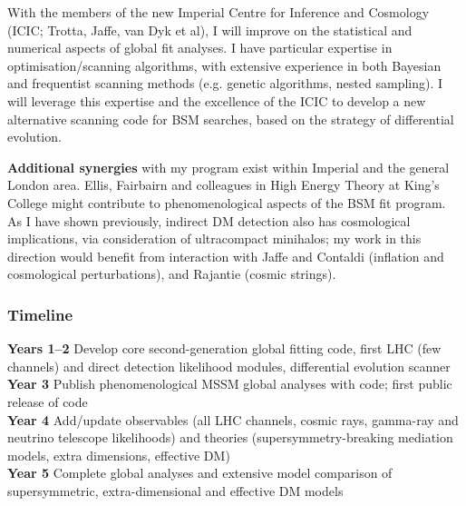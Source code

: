 \documentclass[10pt,oneside,twocolumn,a4paper]{article}
\begin{document}
With the members of the new Imperial Centre for Inference and Cosmology (ICIC; Trotta, Jaffe, van Dyk et al), I will improve on the statistical and numerical aspects of global fit analyses.  I have particular expertise in optimisation/scanning algorithms, with extensive experience in both Bayesian and frequentist scanning methods (e.g. genetic algorithms, nested sampling).  I will leverage this expertise and the excellence of the ICIC to develop a new alternative scanning code for BSM searches, based on the strategy of differential evolution.

\textbf{Additional synergies} with my program exist within Imperial and the general London area.  Ellis, Fairbairn and colleagues in High Energy Theory at King's College might contribute to phenomenological aspects of the BSM fit program.  As I have shown previously, indirect DM detection also has cosmological implications, via consideration of ultracompact minihalos; my work in this direction would benefit from interaction with Jaffe and Contaldi (inflation and cosmological perturbations), and Rajantie (cosmic strings).

\subsubsection*{Timeline}

\noindent\textbf{Years 1--2} Develop core second-generation global fitting code, first LHC (few channels) and direct detection likelihood modules, differential evolution scanner\\
\noindent\textbf{Year 3} Publish phenomenological MSSM global analyses with code; first public release of code\\
\noindent\textbf{Year 4} Add/update observables (all LHC channels, cosmic rays, gamma-ray and neutrino telescope likelihoods) and theories (supersymmetry-breaking mediation models, extra dimensions, effective DM)\\
\noindent\textbf{Year 5} Complete global analyses and extensive model comparison of supersymmetric, extra-dimensional and effective DM models
\end{document}
